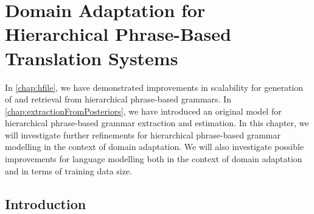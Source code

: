 \chapter{Domain Adaptation for Hierarchical Phrase-Based Translation Systems}
\label{chap:wmt}


In \autoref{chap:hfile}, we have demonstrated improvements in scalability
for generation of and retrieval from hierarchical phrase-based grammars.
In \autoref{chap:extractionFromPosteriors}, we have introduced
an original model for hierarchical phrase-based grammar extraction
and estimation. In this chapter, we will investigate further
refinements for hierarchical phrase-based grammar modelling in the context
of domain adaptation. We will also investigate possible improvements
for language modelling both in the context of domain adaptation and
in terms of training data size.

\section{Introduction}

